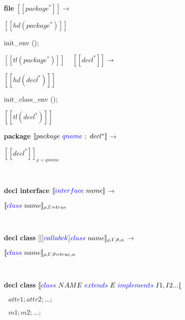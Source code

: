 \documentclass[a4paper, 11pt]{report}
\begin{document}
\begin{multicols}{2}
\textbf{file}
\newline
\noindent
$[\![ package^* ]\!]$$\longrightarrow$

$[\![ hd(package^*) ]\!]$
\begin{OCaml}
   init_env ();
\end{OCaml} 

$[\![ tl(package^*) ]\!]$ 
\newline
\ 
\newline
\noindent
$[\![ decl^* ]\!]$$\longrightarrow$

$[\![ hd(decl^*) ]\!]$
\begin{OCaml}
   init_class_env ();
\end{OCaml} 

$[\![ tl(decl^*) ]\!]$ 
\newline
\ 
\newline

\textbf{package}
\newline
\noindent
$[\![ package\ {\color{blue}qname}\ ;\ decl^* ]\!]$$\longrightarrow$

$[\![ decl^* ]\!]_{\rho=qname}$ 

\ 
\newline

\textbf{ decl interface }
\newline
\noindent
$[\![{\color{blue}interface}\  name ]\!]$$\longrightarrow$

$[\![{\color{blue}class}\  name ]\!]_{\rho,\Gamma=true}$

\ 
\newline

\textbf{ decl class }
\newline
\noindent
$[\![$[$ {\color{blue}callabck}$]${\color{blue} class}\  name ]\!]_{\rho,\Gamma,\theta,\alpha}$$\longrightarrow$

$[\![{\color{blue}class}\  name ]\!]_{\rho,\Gamma,\theta=true,\alpha}$
\end{multicols}

\ 
\newpage
\noindent

\textbf{ decl class}
\newline
\noindent
$[\![ {\color{blue}class}\ NAME\ 
 {\color{blue}extends}\  E \ 
 {\color{blue}implements}\  I1,I2... \{$

 $ \ \ \ attr1; attr2; ...;$

  $\ \ \ m1; m2; ...;$
\end{document}

